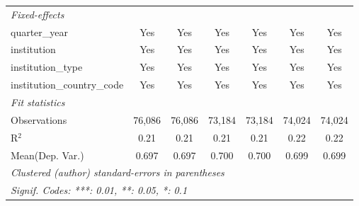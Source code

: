 \begin{tabular}{lcccccc}
   \midrule
   \emph{Fixed-effects}\\
   quarter\_year                      & Yes     & Yes         & Yes     & Yes      & Yes     & Yes\\  
   institution                        & Yes     & Yes         & Yes     & Yes      & Yes     & Yes\\  
   institution\_type                  & Yes     & Yes         & Yes     & Yes      & Yes     & Yes\\  
   institution\_country\_code         & Yes     & Yes         & Yes     & Yes      & Yes     & Yes\\  
   \midrule
   \emph{Fit statistics}\\
   Observations                       & 76,086  & 76,086      & 73,184  & 73,184   & 74,024  & 74,024\\  
   R$^2$                              & 0.21    & 0.21        & 0.21    & 0.21     & 0.22    & 0.22\\  
Mean(Dep. Var.) & 0.697 & 0.697 & 0.700 & 0.700 & 0.699 & 0.699 \\
   \midrule \midrule
   \multicolumn{7}{l}{\emph{Clustered (author) standard-errors in parentheses}}\\
   \multicolumn{7}{l}{\emph{Signif. Codes: ***: 0.01, **: 0.05, *: 0.1}}\\
\end{tabular}
\par\endgroup
